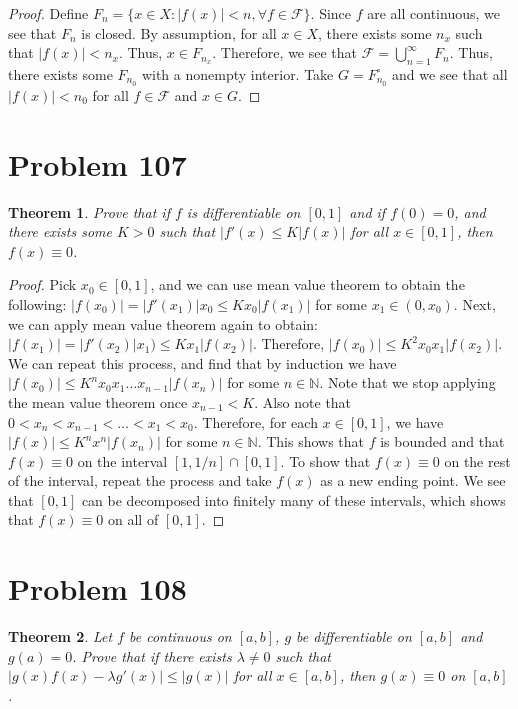 \documentclass[psamsfonts]{amsart}
\newtheorem{thm}{Theorem}[section]
\theoremstyle{definition}
\theoremstyle{remark}
\numberwithin{equation}{section}
\begin{document}
\begin{proof}
Define $F_n = \{ x \in X: |f(x)| < n,  \forall f \in \mathscr{F} \}$. Since $f$ are all continuous, we see that $F_n$ is closed. By assumption, for all $x \in X$, there exists some $n_x$ such that $|f(x)| < n_x$. Thus, $x \in F_{n_x}$. Therefore, we see that $\mathscr{F} = \bigcup_{n=1}^\infty F_n$. Thus, there exists some $F_{n_0}$ with a nonempty interior. Take $G = F_{n_0}^{\circ}$ and we see that all $|f(x)| < n_0$ for all $f \in \mathscr{F}$ and $x \in G$. 
\end{proof}

\section{Problem 107}

\begin{thm}
Prove that if $f$ is differentiable on $[0,1]$ and if $f(0) = 0$, and there exists some $K > 0$ such that $|f'(x) \leq K |f(x)|$ for all $x \in [0,1]$, then $f(x) \equiv 0$. 
\end{thm}

\begin{proof}
Pick $x_0 \in [0,1]$, and we can use mean value theorem to obtain the following: $|f(x_0)| = |f'(x_1)| x_0  \leq K x_0 |f(x_1)|$ for some $x_1 \in (0, x_0)$. Next, we can apply mean value theorem again to obtain: $|f(x_1)| = |f'(x_2)| x_1) \leq K x_1 |f(x_2)|$. Therefore, $|f(x_0)| \leq  K^2 x_0 x_1 |f(x_2)|$. We can repeat this process, and find that by induction we have $|f(x_0)| \leq K^n x_0 x_1 \ldots x_{n-1} |f(x_n)|$ for some $n \in \mathbb{N}$. Note that we stop applying the mean value theorem once $x_{n-1} < K$. Also note that $0 < x_n < x_{n-1} < \ldots < x_1 < x_0$. Therefore, for each $x \in [0,1]$, we have $|f(x)| \leq K^n x^n |f(x_n)|$ for some $n \in \mathbb{N}$. This shows that $f$ is bounded and that $f(x) \equiv 0$ on the interval $[1, 1/n] \cap [0,1]$. To show that $f(x) \equiv 0$ on the rest of the interval, repeat the process and take $f(x)$ as a new ending point. We see that $[0,1]$ can be decomposed into finitely many of these intervals, which shows that $f(x) \equiv 0$ on all of $[0,1]$. 
\end{proof}

\section{Problem 108}

\begin{thm}
Let $f$ be continuous on $[a,b]$, $g$ be differentiable on $[a,b]$ and $g(a) = 0$. Prove that if there exists $\lambda \neq 0$ such that $|g(x) f(x) - \lambda g'(x)| \leq |g(x)|$ for all $x \in [a,b]$, then $g(x) \equiv 0$ on $[a,b]$. 
\end{thm}
\end{document}
